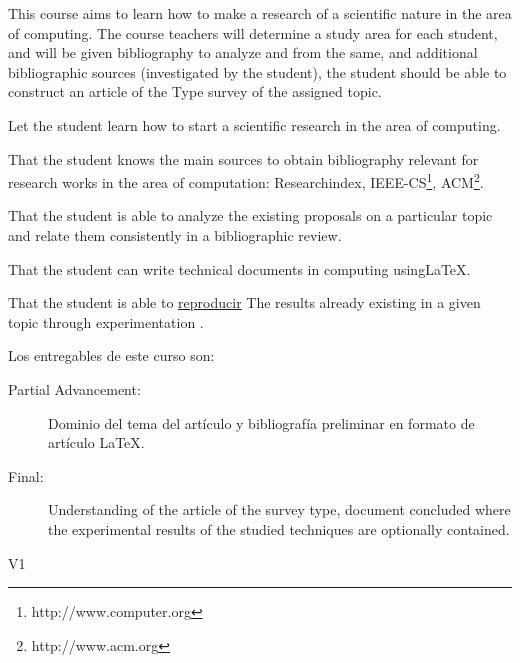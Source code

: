 \begin{syllabus}


\begin{justification}
This course aims to learn how to make a research of a scientific nature in the area of computing. The course teachers will determine a study area for each student, and will be given bibliography to analyze and from the same, and additional bibliographic sources (investigated by the student), the student should be able to construct an article of the Type survey of the assigned topic.
\end{justification}

\begin{goals}
\item Let the student learn how to start a scientific research in the area of computing.
\item That the student knows the main sources to obtain bibliography relevant for research works in the area of computation: Researchindex, IEEE-CS\footnote{http://www.computer.org}, ACM\footnote{http://www.acm.org}.
\item That the student is able to analyze the existing proposals on a particular topic and relate them consistently in a bibliographic review.
\item That the student can write technical documents in computing using\LaTeX.
\item That the student is able to \underline{reproducir} The results already existing in a given topic through experimentation .
\item Los entregables de este curso son:
	\begin{description}
	\item [Partial Advancement:] Dominio del tema del artículo y bibliografía preliminar en formato de artículo \LaTeX.
	\item [Final:] Understanding of the article of the survey type, document concluded where the experimental results of the studied techniques are optionally contained.
	\end{description}
\end{goals}

\begin{outcomes}{V1}
  \item {}
  \item {}
  \item {}
  \item {}
  \item {}
  \item {}
\end{outcomes}


\end{syllabus}
